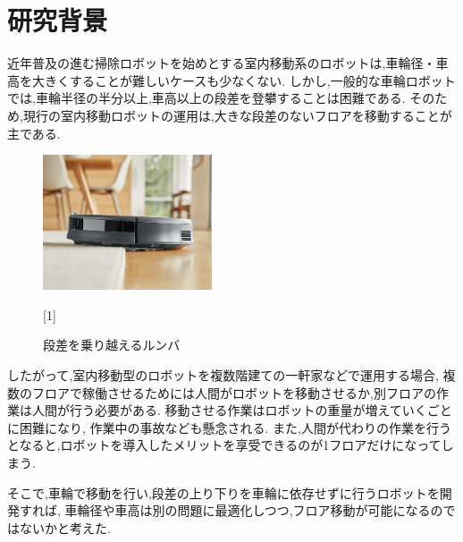 \documentclass[dvipdfmx]{jsarticle}
\begin{document}

\section{研究背景}
近年普及の進む掃除ロボットを始めとする室内移動系のロボットは,車輪径・車高を大きくすることが難しいケースも少なくない.
しかし,一般的な車輪ロボットでは,車輪半径の半分以上,車高以上の段差を登攀することは困難である.
そのため,現行の室内移動ロボットの運用は,大きな段差のないフロアを移動することが主である.
\begin{figure}[H]
  \centering
  \includegraphics[width=50mm]{image/roomba.png}
  \caption{段差を乗り越えるルンバ}
  [1]
  \label{fig:runba}
\end{figure}
したがって,室内移動型のロボットを複数階建ての一軒家などで運用する場合,
複数のフロアで稼働させるためには人間がロボットを移動させるか,別フロアの作業は人間が行う必要がある.
移動させる作業はロボットの重量が増えていくごとに困難になり,
作業中の事故なども懸念される.
また,人間が代わりの作業を行うとなると,ロボットを導入したメリットを享受できるのが1フロアだけになってしまう.

そこで,車輪で移動を行い,段差の上り下りを車輪に依存せずに行うロボットを開発すれば,
車輪径や車高は別の問題に最適化しつつ,フロア移動が可能になるのではないかと考えた.
\end{document}
